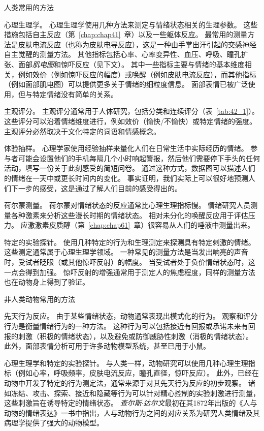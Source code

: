 \begin{proposition}[测量情绪的方法] \label{box:42_1}
	
	\quad \quad 人类常用的方法
	
	\quad \quad 心理生理学。
	心理生理学使用几种方法来测定与情绪状态相关的生理参数。
	这些措施包括自主反应（第~\ref{chap:chap41}~章）以及一些躯体反应。
	最常用的测量方法是皮肤电流反应（也称为皮肤电导反应），这是一种由手掌出汗引起的交感神经自主觉醒的测量方法。
	其他指标包括心率、心率变异性、血压、呼吸、瞳孔扩张、面部\textit{肌电图}和惊吓反应（见下文）。
	其中一些指标主要与情绪的基本维度相关，例如效价（例如惊吓反应的幅度）或唤醒（例如皮肤电流反应），而其他指标（例如面部肌电图）可以提供更多关于情绪的细粒度信息。
	面部表情已被广泛使用，但与特定情绪没有简单的关系。
	
	\quad \quad 主观评分。
	主观评分通常用于人体研究，包括分类和连续评分（表~\ref{tab:42_1}）。
	这些评分可以沿着情绪维度进行，例如效价（愉快/不愉快）或特定情绪的强度。
	主观评分必然取决于文化特定的词语和情感概念。
	
	\quad \quad 体验抽样。
	心理学家使用经验抽样来量化人们在日常生活中实际经历的情绪。
	参与者可能会设置他们的手机每隔几个小时响起警报，然后他们需要停下手头的任何活动，填写一份关于此刻感受的简短问卷。
	通过这种方式，数据图可以描述人们的情绪在一天中或更长时间内的变化。
	事实证明，我们实际上可以很好地预测人们下一步的感受，这是通过了解人们目前的感受得出的。
	
	\quad \quad 荷尔蒙测量。
	荷尔蒙对情绪状态的反应通常比心理生理指标慢。
	情绪研究人员测量各种激素来分析这些漫长时期的情绪状态。
	相对未分化的唤醒反应用于评估压力。
	应激激素皮质醇（第~\ref{chap:chap61}~章）很容易从人们的唾液中测量出来。
	
	\quad \quad 特定的实验探针。
	使用几种特定的行为和生理测定来探测具有特定刺激的情绪。
	这些测定通常属于心理生理学领域。
	一种常见的测量方法是当发出响亮的声音时，受试者眨眼（或其他惊吓反射）的幅度。
	当受试者处于负价情绪状态时，这一点会得到加强。
	惊吓反射的增强通常用于测定人的焦虑程度，同样的测量方法也在动物身上得到了验证。
	
	\quad \quad 非人类动物常用的方法
	
	\quad \quad 先天行为反应。
	由于某些情绪状态，动物通常表现出模式化的行为。
	观察和评分行为是衡量情绪行为的一种方法。
	这种行为可以包括接近有回报或承诺未来有回报的刺激（积极的情绪状态），以及避免或防御威胁性刺激（消极的情绪状态）。
	此外，面部表情分析可用于许多动物模型系统，甚至已用于小鼠。
	
	\quad \quad 心理生理学和特定的实验探针。
	与人类一样，动物研究可以使用几种心理生理指标（例如心率，呼吸频率，皮肤电流反应，瞳孔直径，惊吓反应）。
	此外，已经在动物中开发了特定的行为测定法，通常来源于对其先天行为反应的初步观察。
	诸如冻结、攻击、探索、接近和隐藏等行为可以针对精心控制的实验刺激进行测量，这些刺激旨在诱导特定的情绪状态。
	\textit{查尔斯$\cdot$达尔文}最初在其1872年出版的《人与动物的情绪表达》一书中指出，人与动物行为之间的对应关系为研究人类情绪及其病理学提供了强大的动物模型。
	
\end{proposition}


